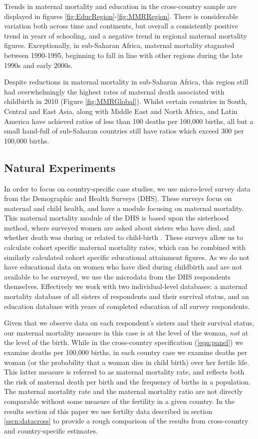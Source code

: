 \documentclass{article}[12pt,subeqn]
\begin{document}
\begin{spacing}{1.4}
Trends in maternal mortality and education in the cross-country sample are 
displayed in figures \ref{fig:EducRegion}-\ref{fig:MMRRegion}. There is 
considerable variation both across time and continents, but overall a 
consistently positive trend in years of schooling, and a negative trend in 
regional maternal mortality figures. Exceptionally, in sub-Saharan Africa, 
maternal mortality stagnated between 1990-1995, beginning to fall in line with 
other regions during the late 1990s and early 2000s.

Despite reductions in maternal mortality in sub-Saharan Africa, this region still 
had overwhelmingly the highest rates of maternal death associated with childbirth 
in 2010 (Figure \ref{fig:MMRGlobal}). Whilst certain countries in South, Central 
and East Asia, along with Middle East and North Africa, and Latin America have 
achieved ratios of less than 100 deaths per 100,000 births, all but a small 
hand-full of sub-Saharan countries still have ratios which exceed 300 per 100,000 
births.


\subsection{Natural Experiments}
\label{sscn:dataexp}
In order to focus on country-specific case studies, we use micro-level survey 
data from the Demographic and Health Surveys (DHS). These surveys focus on 
maternal and child health, and have a module focusing on maternal mortality. This 
maternal mortality module of the DHS is based upon the sisterhood method, where 
surveyed women are asked about sisters who have died, and whether death was during 
or related to child-birth \citep{RutsteinRojas2006}. These surveys allow us to 
calculate cohort specific maternal mortality rates, which can be combined with 
similarly calculated cohort specific educational attainment figures. As 
we do not have educational data on women who have died during childbirth and are 
not available to be surveyed, we use the microdata from the DHS respondents 
themselves.  Effectively we work with two individual-level databases: a maternal 
mortality database of all sisters of respondents and their survival status, and 
an education database with years of completed education of all survey respondents.

Given that we observe data on each respondent's sisters and their survival 
status, our maternal mortality measure in this case is at the level of the woman, 
\emph{not} at the level of the birth.  While in the cross-country specification 
(\ref{eqn:panel}) we examine deaths per 100,000 births, in each country case we 
examine deaths per woman (or the probability that a woman dies in child birth) 
over her fertile life. This latter measure is referred to as maternal mortality 
rate, and reflects both the risk of maternal death per birth and the frequency of 
births in a population.  The maternal mortality rate and the maternal mortality 
ratio are not directly comparable without some measure of the fertility in a given 
country. In the results section of this paper we use fertilty data described in 
section \ref{sscn:datacross} to provide a rough comparison of the results from 
cross-country and country-specific estimates.


\end{spacing}
\end{document}
